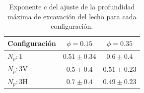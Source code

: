 \begin{table}[H]
    \centering
    \caption{Exponente \(c\) del ajuste de la profundidad máxima de excavación del lecho para cada configuración.}
    \label{tab:exponentes_dmax}
    \begin{tabular}{lcc}
        \toprule
        \textbf{Configuración} & \(\phi = 0.15\) & \(\phi = 0.35\) \\
        \midrule
        \(N_p:1\) & \(0.51 \pm 0.34\) & \(0.6 \pm 0.4\) \\
        \(N_p:3\text{V}\) & \(0.5 \pm 0.4\) & \(0.51 \pm 0.23\) \\
        \(N_p:3\text{H}\) & \(0.7 \pm 0.4\) & \(0.49 \pm 0.23\) \\
        \bottomrule
    \end{tabular}
\end{table}